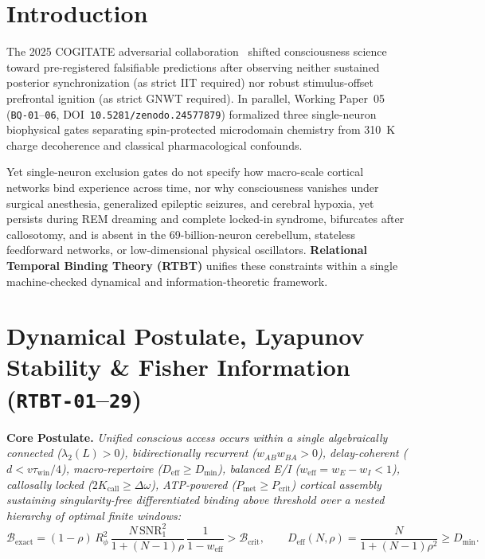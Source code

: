 \documentclass[11pt,letterpaper]{article}
\newcommand{\code}[1]{\texttt{\small #1}}
\begin{document}
\tableofcontents

\section{Introduction}

The 2025 COGITATE adversarial collaboration~\cite{COGITATE2025} shifted consciousness science toward pre-registered falsifiable predictions after observing neither sustained posterior synchronization (as strict IIT required) nor robust stimulus-offset prefrontal ignition (as strict GNWT required). In parallel, Working Paper~05~\cite{WP05} (\code{BQ-01}--\code{06}, DOI~\texttt{10.5281/zenodo.24577879}) formalized three single-neuron biophysical gates separating spin-protected microdomain chemistry from 310~K charge decoherence and classical pharmacological confounds.

Yet single-neuron exclusion gates do not specify how macro-scale cortical networks bind experience across time, nor why consciousness vanishes under surgical anesthesia, generalized epileptic seizures, and cerebral hypoxia, yet persists during REM dreaming and complete locked-in syndrome, bifurcates after callosotomy, and is absent in the 69-billion-neuron cerebellum, stateless feedforward networks, or low-dimensional physical oscillators. \textbf{Relational Temporal Binding Theory (RTBT)} unifies these constraints within a single machine-checked dynamical and information-theoretic framework.

\section{Dynamical Postulate, Lyapunov Stability \& Fisher Information (\code{RTBT-01}--\code{29})}

\textbf{Core Postulate.} \emph{Unified conscious access occurs within a single algebraically connected ($\lambda_2(L)>0$), bidirectionally recurrent ($w_{AB}w_{BA}>0$), delay-coherent ($d < v\tau_{\mathrm{win}}/4$), macro-repertoire ($D_{\mathrm{eff}} \ge D_{\min}$), balanced E/I ($w_{\mathrm{eff}} = w_E - w_I < 1$), callosally locked ($2K_{\mathrm{call}} \ge \Delta\omega$), ATP-powered ($P_{\mathrm{met}} \ge P_{\mathrm{crit}}$) cortical assembly sustaining singularity-free differentiated binding above threshold over a nested hierarchy of optimal finite windows:}
\begin{equation}
  \mathcal{B}_{\mathrm{exact}} = (1-\rho)\,R_\phi^2\,\frac{N\,\mathrm{SNR}_1^2}{1+(N-1)\rho}\,\frac{1}{1 - w_{\mathrm{eff}}} > \mathcal{B}_{\mathrm{crit}},
  \qquad
  D_{\mathrm{eff}}(N,\rho) = \frac{N}{1 + (N-1)\rho^2} \ge D_{\min}.
\end{equation}
\end{document}
